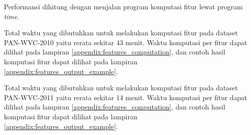 Performansi dihitung dengan menjalan program komputasi fitur lewat program
\textit{time}.

Total waktu yang dibutuhkan untuk melakukan komputasi fitur pada dataset
PAN-WVC-2010 yaitu rerata sekitar 43 menit.
Waktu komputasi per fitur dapat dilihat pada lampiran
\ref{appendix:features_computation},
dan contoh hasil komputasi fitur dapat dilihat pada lampiran
\ref{appendix:features_output_example}.

Total waktu yang dibutuhkan untuk melakukan komputasi fitur pada dataset
PAN-WVC-2011 yaitu rerata sekitar 14 menit.
Waktu komputasi per fitur dapat dilihat pada lampiran
\ref{appendix:features_computation},
dan contoh hasil komputasi fitur dapat dilihat pada lampiran
\ref{appendix:features_output_example}.
